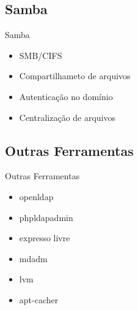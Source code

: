 \renewcommand{\titulo}{Samba}
\subsection{\titulo}
\begin{frame}{\titulo}
\begin{itemize}
\item SMB/CIFS
\item Compartilhameto de arquivos
\item Autenticação no domínio
\item Centralização de arquivos
\end{itemize}
\end{frame}


\renewcommand{\titulo}{Outras Ferramentas}
\subsection{\titulo}
\begin{frame}{\titulo}
\begin{itemize}
\item openldap
\item phpldapadmin
\item expresso livre
\item mdadm
\item lvm
\item apt-cacher
\end{itemize}
\end{frame}
